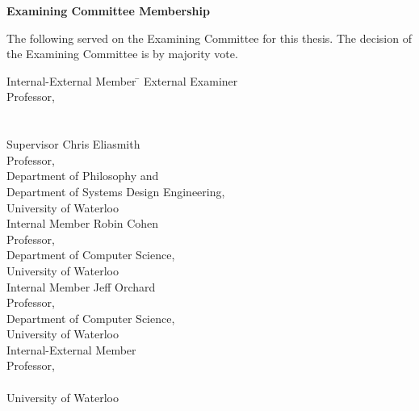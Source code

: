 \begin{center}\textbf{Examining Committee Membership}\end{center}

  \bigskip

  \noindent
The following served on the Examining Committee for this thesis. The decision of the Examining Committee is by majority vote.
  \bigskip
  
  \noindent
\begin{tabbing}
Internal-External Member \quad \=  \kill %
External Examiner \>   \\ 
\> Professor, \\
\> \\
\>  \\[0.75cm]
Supervisor \> Chris Eliasmith \\
\> Professor, \\
\> Department of Philosophy and \\
\> Department of Systems Design Engineering, \\
\> University of Waterloo \\[0.75cm]
Internal Member \> Robin Cohen \\
\> Professor, \\
\> Department of Computer Science, \\
\> University of Waterloo \\[0.5cm]
Internal Member \> Jeff Orchard \\
\> Professor, \\
\> Department of Computer Science, \\
\> University of Waterloo \\[0.5cm]
Internal-External Member \>  \\
\> Professor, \\
\>  \\
\> University of Waterloo
\end{tabbing}


\clearpage
